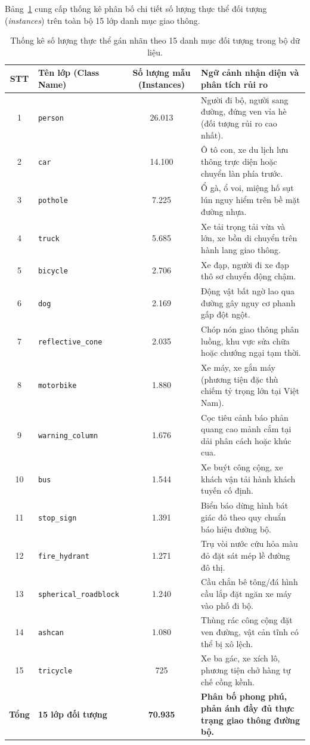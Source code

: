 Bảng~\ref{tab:class_instances_distribution} cung cấp thống kê phân bố chi tiết số lượng thực thể đối tượng (\textit{instances}) trên toàn bộ 15 lớp danh mục giao thông. 

\begin{table}[htbp]
\centering
\caption{Thống kê số lượng thực thể gán nhãn theo 15 danh mục đối tượng trong bộ dữ liệu.}
\label{tab:class_instances_distribution}
\small
\begin{tabular}{|c|l|c|p{7.5cm}|}
\hline
\textbf{STT} & \textbf{Tên lớp (Class Name)} & \textbf{Số lượng mẫu (Instances)} & \textbf{Ngữ cảnh nhận diện và phân tích rủi ro} \\ \hline
1 & \texttt{person} & 26.013 & Người đi bộ, người sang đường, đứng ven vỉa hè (đối tượng rủi ro cao nhất). \\ \hline
2 & \texttt{car} & 14.100 & Ô tô con, xe du lịch lưu thông trực diện hoặc chuyển làn phía trước. \\ \hline
3 & \texttt{pothole} & 7.225 & Ổ gà, ổ voi, miệng hố sụt lún nguy hiểm trên bề mặt đường nhựa. \\ \hline
4 & \texttt{truck} & 5.685 & Xe tải trọng tải vừa và lớn, xe bồn di chuyển trên hành lang giao thông. \\ \hline
5 & \texttt{bicycle} & 2.706 & Xe đạp, người đi xe đạp thô sơ chuyển động chậm. \\ \hline
6 & \texttt{dog} & 2.169 & Động vật bất ngờ lao qua đường gây nguy cơ phanh gấp đột ngột. \\ \hline
7 & \texttt{reflective\_cone} & 2.035 & Chóp nón giao thông phân luồng, khu vực sửa chữa hoặc chướng ngại tạm thời. \\ \hline
8 & \texttt{motorbike} & 1.880 & Xe máy, xe gắn máy (phương tiện đặc thù chiếm tỷ trọng lớn tại Việt Nam). \\ \hline
9 & \texttt{warning\_column} & 1.676 & Cọc tiêu cảnh báo phản quang cao mảnh cắm tại dải phân cách hoặc khúc cua. \\ \hline
10 & \texttt{bus} & 1.544 & Xe buýt công cộng, xe khách vận tải hành khách tuyến cố định. \\ \hline
11 & \texttt{stop\_sign} & 1.391 & Biển báo dừng hình bát giác đỏ theo quy chuẩn báo hiệu đường bộ. \\ \hline
12 & \texttt{fire\_hydrant} & 1.271 & Trụ vòi nước cứu hỏa màu đỏ đặt sát mép lề đường đô thị. \\ \hline
13 & \texttt{spherical\_roadblock} & 1.240 & Cầu chắn bê tông/đá hình cầu lắp đặt ngăn xe máy vào phố đi bộ. \\ \hline
14 & \texttt{ashcan} & 1.080 & Thùng rác công cộng đặt ven đường, vật cản tĩnh có thể bị xô lệch. \\ \hline
15 & \texttt{tricycle} & 725 & Xe ba gác, xe xích lô, phương tiện chở hàng tự chế cồng kềnh. \\ \hline
\textbf{Tổng} & \textbf{15 lớp đối tượng} & \textbf{70.935} & \textbf{Phân bố phong phú, phản ánh đầy đủ thực trạng giao thông đường bộ.} \\ \hline
\end{tabular}
\end{table}


